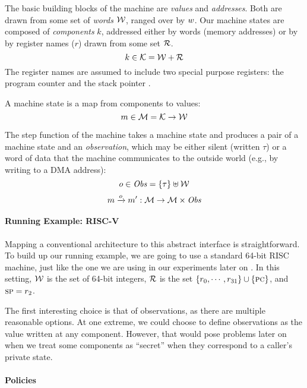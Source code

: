 \documentclass[acmsmall,review,anonymous]{acmart}\settopmatter{printfolios=true,printccs=false,printacmref=false}
\begin{document}
The basic building blocks of the machine are {\em values} and {\em
  addresses}. Both are drawn from some set of {\em words}
${\mathcal W}$, ranged over by $w$.
%
Our machine states are composed of {\em components} $k$, addressed either by
words (memory addresses) or by by register names ($r$) drawn from some set
${\mathcal R}$.
%
    \[k \in {\mathcal K} = {\mathcal W} + {\mathcal R} \]
%
The register names are assumed to include two special purpose registers: the
program counter {\PCname} and the stack pointer \SP.

A machine state is a map from components to values:
%
\[m \in {\mathcal M} = {\mathcal K} \rightarrow {\mathcal W}\]

The step function of the
machine takes a machine state and produces a pair of a
machine state and an {\em observation}, which may be either
silent (written $\tau$) or a word of data that the machine communicates to
the outside world (e.g., by writing to a DMA address):
%
\[o \in \mathit{Obs} = \{\tau\} \uplus {\mathcal W}\]
\[m \xrightarrow{o} m' : {\mathcal M} \rightarrow {\mathcal M} \times \mathit{Obs} \]
%

\paragraph*{Running Example: RISC-V}

Mapping a conventional architecture to this abstract interface is
straightforward. To build up our running example, we are going to use
a standard 64-bit RISC machine, just like the one we are using in our
experiments later on . In this setting, ${\mathcal W}$
is the set of 64-bit integers, ${\mathcal R}$ is the set $\{r_0, \cdots,
r_{31}\} \cup \{\textsc{pc}\}$, and $\textsc{sp} = r_2$.

The first interesting choice is that of observations, as there are
multiple reasonable options. At one extreme, we could choose to define
observations as the value written at any component. However, that
would pose problems later on when we treat some components as ``secret''
when they correspond to a caller's private state.   

\paragraph*{Policies}
\end{document}
